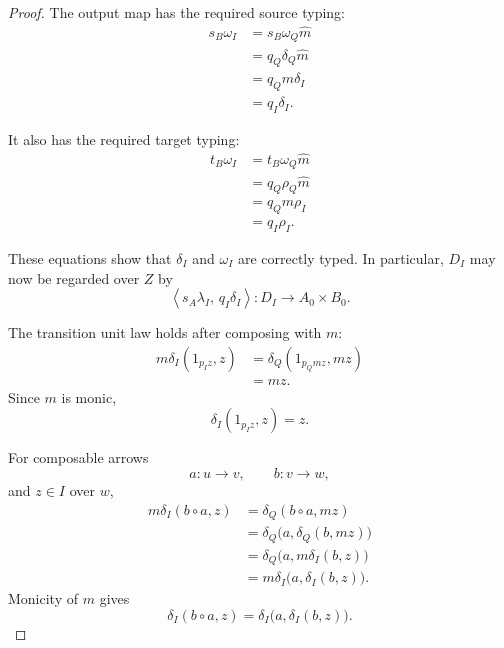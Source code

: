 \begin{proof}
    The output map has the required source typing:
    \[
    \begin{aligned}
        s_B\omega_I
        &=
        s_B\omega_Q\widehat m
        \\
        &=
        q_Q\delta_Q\widehat m
        \\
        &=
        q_Qm\delta_I
        \\
        &=
        q_I\delta_I.
    \end{aligned}
    \]

    It also has the required target typing:
    \[
    \begin{aligned}
        t_B\omega_I
        &=
        t_B\omega_Q\widehat m
        \\
        &=
        q_Q\rho_Q\widehat m
        \\
        &=
        q_Qm\rho_I
        \\
        &=
        q_I\rho_I.
    \end{aligned}
    \]

    These equations show that \(\delta_I\) and \(\omega_I\) are correctly
    typed. In particular, \(D_I\) may now be regarded over \(Z\) by
    \[
        \left\langle
            s_A\lambda_I,\,
            q_I\delta_I
        \right\rangle:
        D_I\to A_0\times B_0.
    \]

    The transition unit law holds after composing with \(m\):
    \[
    \begin{aligned}
        m\delta_I(1_{p_Iz},z)
        &=
        \delta_Q(1_{p_Qmz},mz)
        \\
        &=
        mz.
    \end{aligned}
    \]
    Since \(m\) is monic,
    \[
        \delta_I(1_{p_Iz},z)=z.
    \]

    For composable arrows
    \[
        a:u\to v,
        \qquad
        b:v\to w,
    \]
    and \(z\in I\) over \(w\),
    \[
    \begin{aligned}
        m\delta_I(b\circ a,z)
        &=
        \delta_Q(b\circ a,mz)
        \\
        &=
        \delta_Q
        \bigl(
            a,
            \delta_Q(b,mz)
        \bigr)
        \\
        &=
        \delta_Q
        \bigl(
            a,
            m\delta_I(b,z)
        \bigr)
        \\
        &=
        m\delta_I
        \bigl(
            a,
            \delta_I(b,z)
        \bigr).
    \end{aligned}
    \]
    Monicity of \(m\) gives
    \[
        \delta_I(b\circ a,z)
        =
        \delta_I
        \bigl(
            a,
            \delta_I(b,z)
        \bigr).
    \]


\end{proof}
